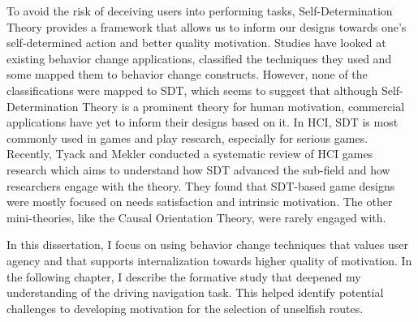To avoid the risk of deceiving users into performing tasks, Self-Determination Theory provides a framework that allows us to inform our designs towards one's self-determined action and better quality motivation. Studies have looked at existing behavior change applications, classified the techniques they used and some mapped them to behavior change constructs\cite{lister2014just,stawarz2014don,cowan2013apps}. However, none of the classifications were mapped to SDT, which seems to suggest that although Self-Determination Theory is a prominent theory for human motivation, commercial applications have yet to inform their designs based on it. In HCI, SDT is most commonly used in games and play research, especially for serious games. Recently, Tyack and Mekler conducted a systematic review of HCI games research which aims to understand how SDT advanced the sub-field and how researchers engage with the theory\cite{tyack2020self}. They found that SDT-based game designs were mostly focused on needs satisfaction and intrinsic motivation. The other mini-theories, like the Causal Orientation Theory, were rarely engaged with.  

In this dissertation, I focus on using behavior change techniques that values user agency and that supports internalization towards higher quality of motivation. In the following chapter, I describe the formative study that deepened my understanding of the driving navigation task. This helped identify potential challenges to developing motivation for the selection of unselfish routes.